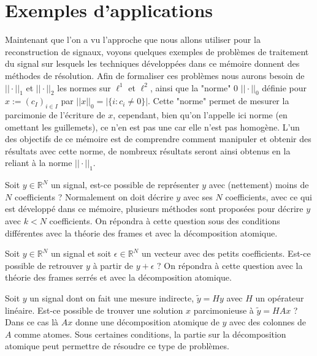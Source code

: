 \section{Exemples d'applications}
Maintenant que l'on a vu l'approche que nous allons utiliser pour la reconstruction de signaux, voyons quelques exemples de problèmes de traitement du signal sur lesquels les techniques développées dans ce mémoire donnent des méthodes de résolution.
Afin de formaliser ces problèmes nous aurons besoin de $||\cdot||_1$ et $||\cdot||_2$ les normes sur $\ell^1$ et $\ell^2$, ainsi que la "norme" 0 $||\cdot||_0$ définie pour $x:=(c_I)_{i\in I}$ par  $||x||_0 = |\{i: c_i \neq 0\}|$. 
Cette "norme" permet de mesurer la parcimonie de l'écriture de $x$, cependant, bien qu'on l'appelle ici norme (en omettant les guillemets), ce n'en est pas une car elle n'est pas homogène.
L'un des objectifs de ce mémoire est de comprendre comment manipuler et obtenir des résultats avec cette norme, de nombreux résultats seront ainsi obtenus en la reliant à la norme $||\cdot||_1$.
\begin{exemple}[Compression]
	Soit $y \in \mathbb{R}^N$ un signal, est-ce possible de représenter $y$ avec (nettement) moins de $N$ coefficients ?
	\newline
	Normalement on doit décrire $y$ avec ses $N$ coefficients, avec ce qui est développé dans ce mémoire, plusieurs méthodes sont proposées pour décrire $y$ avec $k<N$ coefficients.
	On répondra à cette question sous des conditions différentes avec la théorie des frames et avec la décomposition atomique.
\end{exemple}	
\begin{exemple}[Débruitage]
	Soit $y \in \mathbb{R}^N$ un signal et soit $\epsilon \in \mathbb{R}^N$ un vecteur avec des petits coefficients.
	Est-ce possible de retrouver $y$ à partir de $y+\epsilon$ ?
	\newline
	On répondra à cette question avec la théorie des frames serrés et avec la décomposition atomique.
\end{exemple}
\begin{exemple}
	Soit $y$ un signal dont on fait une mesure indirecte, $\tilde{y} = Hy$ avec $H$ un opérateur linéaire. 
	Est-ce possible de trouver une solution $x$ parcimonieuse à $\tilde{y} = HAx$ ?
	\newline
	Dans ce cas là $Ax$ donne une décomposition atomique de $y$ avec des colonnes de $A$ comme atomes. Sous certaines conditions, la partie sur la décomposition atomique peut permettre de résoudre ce type de problèmes.
\end{exemple}
